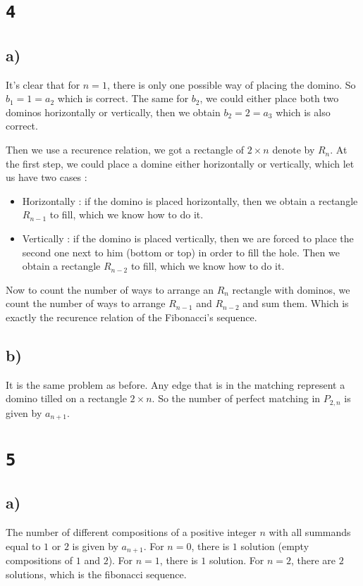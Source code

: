 \documentclass[a4paper,11pt]{report}
\begin{document}
\section*{\texttt{4}}

\subsection*{a)}
It's clear that for $n = 1$, there is only one possible way of placing the
domino. So $b_1 = 1 = a_2$ which is correct. The same for $b_2$, we could either
place both two dominos horizontally or vertically, then we obtain $b_2 = 2 =
a_3$ which is also correct.

Then we use a recurence relation, we got a rectangle of $2 \times n$ denote by
$R_n$. At the first step, we could place a domine either horizontally or
vertically, which let us have two cases :
\begin{itemize}
\item Horizontally : if the domino is placed horizontally, then we obtain a
  rectangle $R_{n-1}$ to fill, which we know how to do it.
\item Vertically : if the domino is placed vertically, then we are forced to
  place the second one next to him (bottom or top) in order to fill the hole.
  Then we obtain a rectangle $R_{n-2}$  to fill, which we know how to do it.
\end{itemize}

Now to count the number of ways to arrange an $R_n$ rectangle with dominos, we
count the number of ways to arrange $R_{n-1}$ and $R_{n-2}$ and sum them. Which
is exactly the recurence relation of the Fibonacci's sequence.

\subsection*{b)}

It is the same problem as before. Any edge that is in the matching represent a
domino tilled on a rectangle $2 \times n$. So the number of perfect matching in
$P_{2,n}$ is given by $a_{n+1}$.

\section*{\texttt{5}}

\subsection*{a)}
The number of different compositions of a positive integer $n$ with all summands
equal to $1$ or $2$ is given by $a_{n+1}$. For $n=0$, there is $1$ solution
(empty compositions of $1$ and $2$). For $n = 1$, there is $1$ solution.
For $n=2$, there are $2$ solutions, which is the fibonacci sequence.
\end{document}
